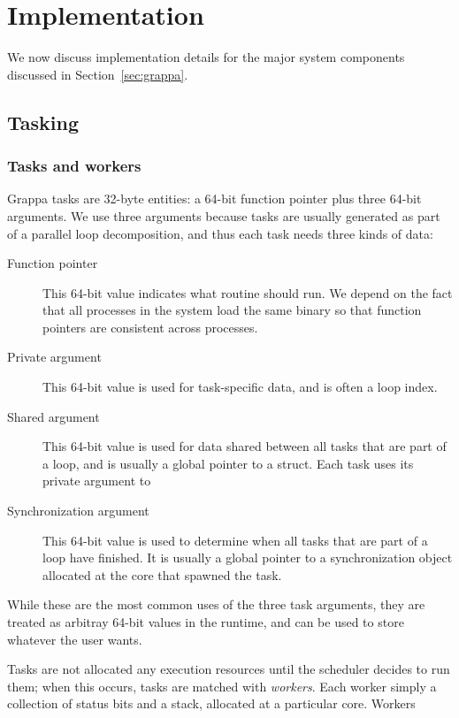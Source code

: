 \section{Implementation} \label{sec:implementation}

We now discuss implementation details for the major system components discussed in Section~\ref{sec:grappa}.

\subsection{Tasking}

\subsubsection{Tasks and workers}

Grappa tasks are 32-byte entities: a 64-bit function pointer plus
three 64-bit arguments. We use three arguments because tasks are
usually generated as part of a parallel loop decomposition, and thus
each task needs three kinds of data:
\begin{description}
\item[Function pointer] This 64-bit value indicates what routine
  should run. We depend on the fact that all processes in the system
  load the same binary so that function pointers are consistent across
  processes.
\item[Private argument] This 64-bit value is used for task-specific
  data, and is often a loop index.
\item[Shared argument] This 64-bit value is used for data shared
  between all tasks that are part of a loop, and is usually a global
  pointer to a struct. Each task uses its private argument to 
\item[Synchronization argument] This 64-bit value is used to determine
  when all tasks that are part of a loop have finished. It is usually
  a global pointer to a synchronization object allocated at the core
  that spawned the task.
\end{description}
While these are the most common uses of the three task arguments, they
are treated as arbitray 64-bit values in the runtime, and can be used
to store whatever the user wants.

Tasks are not allocated any execution resources until the scheduler
decides to run them; when this occurs, tasks are matched with {\em
  workers}. Each worker simply a collection of status bits and a
stack, allocated at a particular core. Workers 


